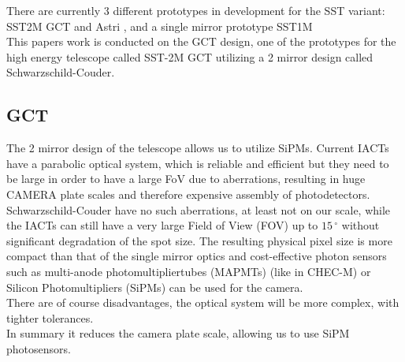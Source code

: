 \documentclass[12pt,article,type=msc,colorback,accentcolor=tud9c]{tudthesis}
\begin{document}
There are currently 3 different prototypes in development for the SST variant: SST2M GCT and Astri , and a single mirror prototype SST1M\\
This papers work is conducted on the GCT design, one of the prototypes for the high energy telescope called SST-2M GCT utilizing a 2 mirror design called Schwarzschild-Couder.

\subsection{GCT}

\begin{figure}[t]
\begin{centering}
}
\caption{If possible replace picture with GCT with mounted CHEC camera picture here Picture from }
\label{fig:GCT_Pic}
\end{centering}
\end{figure}


The 2 mirror design of the telescope allows us to utilize SiPMs. Current IACTs have a parabolic optical system, which is reliable and efficient but they need to be large in order to have a large FoV due to aberrations, resulting in huge CAMERA plate scales and therefore expensive assembly of photodetectors.\\

Schwarzschild-Couder have no such aberrations, at least not on our scale, while the IACTs can still have a very large Field of View (FOV) up to $15\,^{\circ}$ without significant degradation of the spot size. The resulting physical pixel size is more compact than that of the single mirror optics and cost-effective  photon sensors such as multi-anode photomultipliertubes (MAPMTs) (like in CHEC-M) or Silicon Photomultipliers (SiPMs) can be used for the camera.\\
There are of course disadvantages, the optical system will be more complex, with tighter tolerances.\\

In summary it reduces the camera plate scale, allowing us to use SiPM photosensors.
\end{document}

